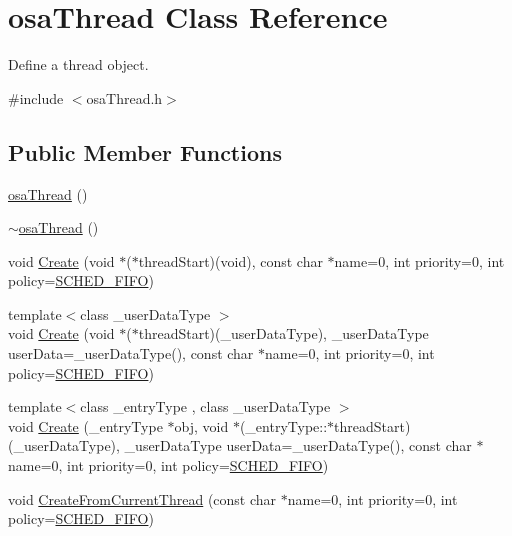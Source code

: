 \hypertarget{classosa_thread}{}\section{osa\+Thread Class Reference}
\label{classosa_thread}


Define a thread object.  




{\ttfamily \#include $<$osa\+Thread.\+h$>$}

\subsection*{Public Member Functions}
\begin{DoxyCompactItemize}
\item 
\hyperlink{classosa_thread_a07af4cb616252c49d88fe4af1c4dff0d}{osa\+Thread} ()
\item 
\hyperlink{classosa_thread_ac3ecb3d70e403a025136b1b7b7512339}{$\sim$osa\+Thread} ()
\item 
void \hyperlink{classosa_thread_acc044c7a382f6909d73464ee96654e9c}{Create} (void $\ast$($\ast$thread\+Start)(void), const char $\ast$name=0, int priority=0, int policy=\hyperlink{osa_thread_8h_ab998332c6538a029b4eed398b7a423da}{S\+C\+H\+E\+D\+\_\+\+F\+I\+F\+O})
\item 
{\footnotesize template$<$class \+\_\+user\+Data\+Type $>$ }\\void \hyperlink{classosa_thread_a8d4e564d8693fd3d58f2bf3c51e6ea2f}{Create} (void $\ast$($\ast$thread\+Start)(\+\_\+user\+Data\+Type), \+\_\+user\+Data\+Type user\+Data=\+\_\+user\+Data\+Type(), const char $\ast$name=0, int priority=0, int policy=\hyperlink{osa_thread_8h_ab998332c6538a029b4eed398b7a423da}{S\+C\+H\+E\+D\+\_\+\+F\+I\+F\+O})
\item 
{\footnotesize template$<$class \+\_\+entry\+Type , class \+\_\+user\+Data\+Type $>$ }\\void \hyperlink{classosa_thread_a474ad4e267aacae8de7ee014a225dacf}{Create} (\+\_\+entry\+Type $\ast$obj, void $\ast$(\+\_\+entry\+Type\+::$\ast$thread\+Start)(\+\_\+user\+Data\+Type), \+\_\+user\+Data\+Type user\+Data=\+\_\+user\+Data\+Type(), const char $\ast$name=0, int priority=0, int policy=\hyperlink{osa_thread_8h_ab998332c6538a029b4eed398b7a423da}{S\+C\+H\+E\+D\+\_\+\+F\+I\+F\+O})
\item 
void \hyperlink{classosa_thread_aa3e4a3f768b9642be4b3efa33ec4ab48}{Create\+From\+Current\+Thread} (const char $\ast$name=0, int priority=0, int policy=\hyperlink{osa_thread_8h_ab998332c6538a029b4eed398b7a423da}{S\+C\+H\+E\+D\+\_\+\+F\+I\+F\+O})

\end{DoxyCompactItemize}
